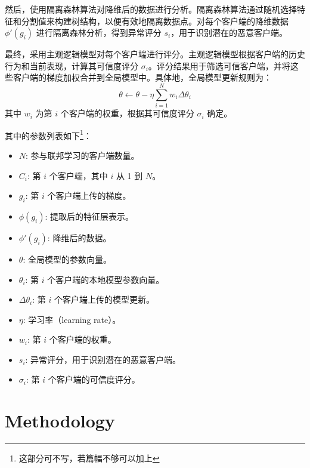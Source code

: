 \documentclass[conference]{IEEEtran}
\begin{document}
然后，使用隔离森林算法对降维后的数据进行分析。隔离森林算法通过随机选择特征和分割值来构建树结构，以便有效地隔离数据点。对每个客户端的降维数据 $\phi'(g_i)$ 进行隔离森林分析，得到异常评分 $s_i$，用于识别潜在的恶意客户端。

最终，采用主观逻辑模型对每个客户端进行评分。主观逻辑模型根据客户端的历史行为和当前表现，计算其可信度评分 $\sigma_i$。评分结果用于筛选可信客户端，并将这些客户端的梯度加权合并到全局模型中。具体地，全局模型更新规则为：
\[
\theta \leftarrow \theta - \eta \sum_{i=1}^N w_i \Delta \theta_i
\]
其中 $w_i$ 为第 $i$ 个客户端的权重，根据其可信度评分 $\sigma_i$ 确定。

其中的参数列表如下\footnote{这部分可不写，若篇幅不够可以加上}：

\begin{itemize}
    \item $N$: 参与联邦学习的客户端数量。
    \item $C_i$: 第 $i$ 个客户端，其中 $i$ 从 1 到 $N$。
    \item $g_i$: 第 $i$ 个客户端上传的梯度。
    \item $\phi(g_i)$: 提取后的特征层表示。
    \item $\phi'(g_i)$: 降维后的数据。
    \item $\theta$: 全局模型的参数向量。
    \item $\theta_i$: 第 $i$ 个客户端的本地模型参数向量。
    \item $\Delta \theta_i$: 第 $i$ 个客户端上传的模型更新。
    \item $\eta$: 学习率（learning rate）。
    \item $w_i$: 第 $i$ 个客户端的权重。
    \item $s_i$: 异常评分，用于识别潜在的恶意客户端。
    \item $\sigma_i$: 第 $i$ 个客户端的可信度评分。
\end{itemize}









\section{Methodology}
\label{method}
\end{document}

